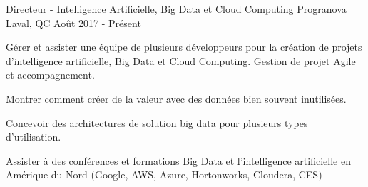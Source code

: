 \begin{cventries}
  \cventry
    {Directeur - Intelligence Artificielle, Big Data et Cloud Computing}
    {Progranova}
    {Laval, QC}
    {Août 2017 - Présent}
    {
      \begin{cvitems}
        \item {Gérer et assister une équipe de plusieurs développeurs pour la création de projets d'intelligence artificielle, Big Data et Cloud Computing. Gestion de projet Agile et accompagnement.}
        \item {Montrer comment créer de la valeur avec des données bien souvent inutilisées.}
        \item {Concevoir des architectures de solution big data pour plusieurs types d'utilisation.}
		\item {Assister à des conférences et formations Big Data et l'intelligence artificielle en Amérique du Nord (Google, AWS, Azure, Hortonworks, Cloudera, CES)}
      \end{cvitems}
    }
	

\end{cventries}
